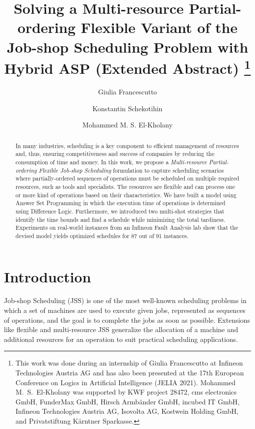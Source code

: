 \documentclass[submission,copyright,creativecommons]{eptcs}
\title{Solving a Multi-resource Partial-ordering Flexible Variant of the Job-shop Scheduling Problem with Hybrid ASP (Extended Abstract) \thanks{This work was done during an internship of Giulia Francescutto at Infineon Technologies Austria AG and has also been presented at the 17th European Conference on Logics in Artificial Intelligence (JELIA 2021).
Mohammed M.\ S.\ El-Kholany was supported by
KWF project 28472,
cms electronics GmbH,
FunderMax GmbH,
Hirsch Armbänder GmbH,
incubed IT GmbH,
Infineon Technologies Austria AG,
Isovolta AG,
Kostwein Holding GmbH, and
Privatstiftung Kärntner Sparkasse.}}
\author{Giulia Francescutto
\institute{Siemens AG {\"O}sterreich, Vienna, Austria}
\email{giulia.francescutto@siemens.com}
\and
Konstantin Schekotihin
\institute{University of Klagenfurt,
Klagenfurt, Austria}
\email{konstantin.schekotihin@aau.at}
\and
Mohammed M. S. El-Kholany
\institute{University of Klagenfurt, Klagenfurt, Austria}
\institute{Cairo University, Cairo, Egypt}
\email{mohammed.el-kholany@aau.at}
}
\newcommand{\jss}{MPF-JSS\xspace}
\begin{document}
\maketitle

\begin{abstract}
  In many industries, scheduling is a key component to efficient management of resources and, thus, ensuring competitiveness and success of companies by reducing the consumption of time and money. In this work, we propose a \emph{Multi-resource Partial-ordering Flexible Job-shop Scheduling} %
  formulation to capture scheduling scenarios where partially-ordered sequences of operations must be scheduled on multiple required resources, such as tools and specialists.
  The resources are flexible and can process one or more kind of operations based on their characteristics. We have built a model using Answer Set Programming %
  in which the execution time of operations is determined using Difference Logic. Furthermore, we introduced two multi-shot strategies that identify the time bounds and find a schedule while minimizing the total tardiness. 
  Experiments on real-world %
  instances from an Infineon Fault Analysis lab %
  show that the devised model %
  yields optimized schedules for $87$ out of $91$ %
  instances.
\end{abstract}

\section{Introduction}
Job-shop Scheduling (JSS) \cite{johnson1954optimal} is one of the most well-known scheduling problems in which a set of machines are used to execute given jobs, represented as sequences of operations, and the goal is to complete the jobs as soon as possible.
Extensions like flexible \cite{brucker1990job} and multi-resource
\cite{DBLP:journals/eor/Dauzere-PeresRL98} JSS
generalize the allocation of a machine and additional resources for an operation
to suit practical scheduling applications.
\end{document}
